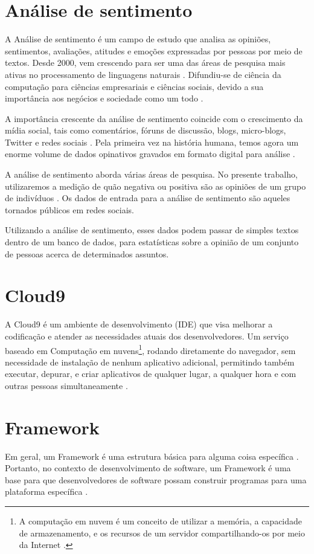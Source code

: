 \section{Análise de sentimento}
\label{sec: analiseSentimento}
A Análise de sentimento é um campo de estudo que analisa as opiniões, sentimentos, avaliações, atitudes e emoções expressadas por pessoas por meio de textos\cite{ASOpinionMining}.
Desde 2000, vem crescendo para ser uma das áreas de pesquisa mais ativas no processamento de linguagens naturais \cite{ASOpinionMining}. Difundiu-se de ciência da computação para ciências empresariais e ciências sociais, devido a sua importância aos negócios e sociedade como um todo \cite{ASOpinionMining}.

A importância crescente da análise de sentimento coincide com o crescimento da mídia social, tais como comentários, fóruns de discussão, blogs, micro-blogs, Twitter e redes sociais \cite{ASOpinionMining}. Pela primeira vez na história humana, temos agora um enorme volume de dados opinativos gravados em formato digital para análise \cite{ASOpinionMining}.

A análise de sentimento aborda várias áreas de pesquisa. No presente trabalho, utilizaremos a medição de quão negativa ou positiva são as opiniões de um grupo de indivíduos \cite{ASFerreiraEBA}. Os dados de entrada para a análise de sentimento são aqueles tornados públicos em redes sociais.

Utilizando a análise de sentimento, esses dados podem passar de simples textos dentro de um banco de dados, para estatísticas sobre a opinião de um conjunto de pessoas acerca de determinados assuntos.

\section{Cloud9}
\label{sec: Cloud9}
A Cloud9 é um ambiente de desenvolvimento (IDE) que visa melhorar a codificação e atender as necessidades atuais dos desenvolvedores. Um serviço baseado em Computação em nuvens\footnote{A computação em nuvem é um conceito de utilizar a memória, a capacidade de armazenamento, e os recursos de um servidor compartilhando-os por meio da Internet \cite{ComputacaoNuvem}.}, rodando diretamente do navegador, sem necessidade de instalação de nenhum aplicativo adicional, permitindo também executar, depurar, e criar aplicativos de qualquer lugar, a qualquer hora e com outras pessoas simultaneamente \cite{C9ComoUsar}.

\section{Framework}
\label{sec: Framework}
Em geral, um Framework é uma estrutura básica para alguma coisa específica \cite{FrameworkByMerriam}. Portanto, no contexto de desenvolvimento de software, um Framework é uma base para que desenvolvedores de software possam construir programas para uma plataforma específica \cite{FrameworkDef}.


